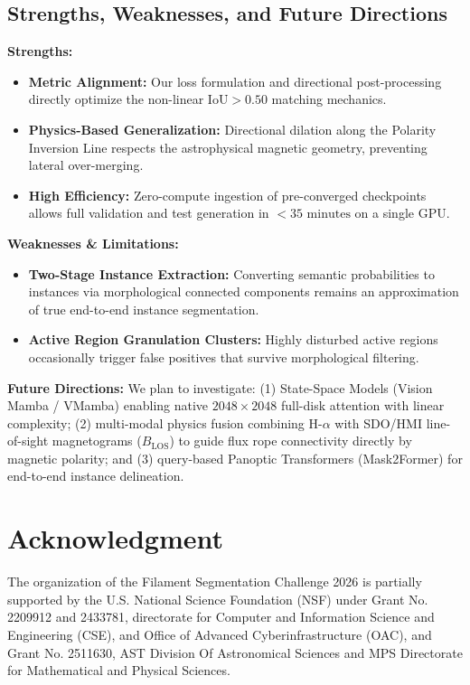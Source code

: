 \documentclass[sigconf]{acmart}
\begin{document}
\subsection{Strengths, Weaknesses, and Future Directions}
\textbf{Strengths:}
\begin{itemize}
    \item \textbf{Metric Alignment:} Our loss formulation and directional post-processing directly optimize the non-linear $\text{IoU} > 0.50$ matching mechanics.
    \item \textbf{Physics-Based Generalization:} Directional dilation along the Polarity Inversion Line respects the astrophysical magnetic geometry, preventing lateral over-merging.
    \item \textbf{High Efficiency:} Zero-compute ingestion of pre-converged checkpoints allows full validation and test generation in $< 35\text{ minutes}$ on a single GPU.
\end{itemize}

\textbf{Weaknesses \& Limitations:}
\begin{itemize}
    \item \textbf{Two-Stage Instance Extraction:} Converting semantic probabilities to instances via morphological connected components remains an approximation of true end-to-end instance segmentation.
    \item \textbf{Active Region Granulation Clusters:} Highly disturbed active regions occasionally trigger false positives that survive morphological filtering.
\end{itemize}

\textbf{Future Directions:}
We plan to investigate: (1) State-Space Models (Vision Mamba / VMamba) enabling native $2048 \times 2048$ full-disk attention with linear complexity; (2) multi-modal physics fusion combining H-$\alpha$ with SDO/HMI line-of-sight magnetograms ($B_{\text{LOS}}$) to guide flux rope connectivity directly by magnetic polarity; and (3) query-based Panoptic Transformers (Mask2Former) for end-to-end instance delineation.

\section{Acknowledgment}\label{sec:acknowledgment}
    The organization of the Filament Segmentation Challenge 2026 is partially supported by the U.S. National Science Foundation (NSF) under Grant No. 2209912 and 2433781, directorate for Computer and Information Science and Engineering (CSE), and Office of Advanced Cyberinfrastructure (OAC), and Grant No. 2511630, AST Division Of Astronomical Sciences and MPS Directorate for Mathematical and Physical Sciences.
\end{document}
